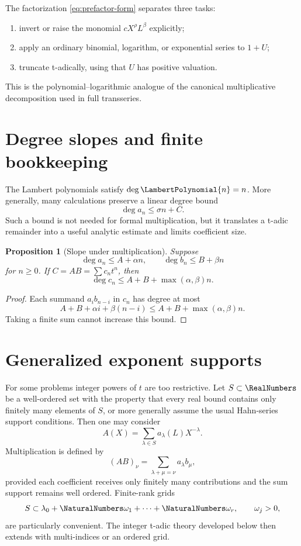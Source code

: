 \documentclass[11pt,openany]{book}
\theoremstyle{definition}
\theoremstyle{plain}
\newtheorem{proposition}{Proposition}[chapter]
\theoremstyle{remark}
\begin{document}
The factorization \eqref{eq:prefactor-form} separates three tasks:
\begin{enumerate}
\item invert or raise the monomial \(cX^\rho L^\beta\) explicitly;
\item apply an ordinary binomial, logarithm, or exponential series to \(1+U\);
\item truncate t-adically, using that \(U\) has positive valuation.
\end{enumerate}
This is the polynomial--logarithmic analogue of the canonical multiplicative
decomposition used in full transseries.

\section{Degree slopes and finite bookkeeping}
The Lambert polynomials satisfy \(\deg \LambertPolynomial{n}=n\).  More generally, many
calculations preserve a linear degree bound
\begin{equation}\label{eq:slope-bound}
 \deg a_n\le \sigma n+C.
\end{equation}
Such a bound is not needed for formal multiplication, but it translates a
t-adic remainder into a useful analytic estimate and limits coefficient size.

\begin{proposition}[Slope under multiplication]\label{prop:slope-product}
Suppose
\[
 \deg a_n\le A+\alpha n,
 \qquad
 \deg b_n\le B+\beta n
\]
for \(n\ge0\).  If \(C=AB=\sum c_nt^n\), then
\[
 \deg c_n\le A+B+\max(\alpha,\beta)n.
\]
\end{proposition}
\begin{proof}
Each summand \(a_i b_{n-i}\) in \(c_n\) has degree at most
\[
 A+B+\alpha i+\beta(n-i)
 \le A+B+\max(\alpha,\beta)n.
\]
Taking a finite sum cannot increase this bound.
\end{proof}

\section{Generalized exponent supports}
For some problems integer powers of \(t\) are too restrictive.  Let
\(S\subset\RealNumbers\) be a well-ordered set with the property that every real bound
contains only finitely many elements of \(S\), or more generally assume the
usual Hahn-series support conditions.  Then one may consider
\begin{equation}\label{eq:generalized-powerlog}
 A(X)=\sum_{\lambda\in S}a_\lambda(L)X^{-\lambda}.
\end{equation}
Multiplication is defined by
\[
 (AB)_\nu=\sum_{\lambda+\mu=\nu}a_\lambda b_\mu,
\]
provided each coefficient receives only finitely many contributions and the
sum support remains well ordered.  Finite-rank grids
\[
 S\subset\lambda_0+\NaturalNumbers\omega_1+\cdots+\NaturalNumbers\omega_r,
 \qquad \omega_j>0,
\]
are particularly convenient.  The integer t-adic theory developed below then
extends with multi-indices or an ordered grid.
\end{document}
